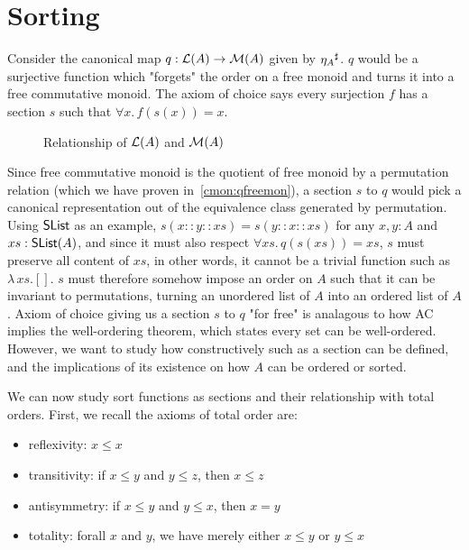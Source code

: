 \section{Sorting}
\label{sec:sorting}

Consider the canonical map $q : \mathcal{L}(A) \to \mathcal{M}(A)$ given by ${\eta_A}^{\sharp}$. $q$ would be a surjective
function which "forgets" the order on a free monoid and turns it into a free commutative monoid.
The axiom of choice says every surjection $f$ has a section $s$ such that $\forall x.\, f(s(x)) = x$.

\begin{figure}[H]
    \centering
    \caption{Relationship of $\mathcal{L}(A)$ and $\mathcal{M}(A)$}
    \label{fig:enter-label}
\end{figure}

Since free commutative monoid is the quotient of free monoid by a permutation relation
(which we have proven in~\ref{cmon:qfreemon}), a section $s$ to $q$ would pick a canonical representation
out of the equivalence class generated by permutation.
Using $\operatorname{\mathsf{SList}}$ as an example, $s(x :: y :: xs) = s(y :: x :: xs)$ for any $x, y : A$ and $xs : \operatorname{\mathsf{SList}}(A)$,
and since it must also respect $\forall xs.\,q(s(xs)) = xs$, $s$ must preserve all content of $xs$,
in other words, it cannot be a trivial function such as $\lambda\,xs. []$.
$s$ must therefore
somehow impose an order on $A$ such that it can be invariant to permutations, turning an unordered list of $A$
into an ordered list of $A$. Axiom of choice giving us a section $s$ to $q$ "for free" is analagous to how
AC implies the well-ordering theorem, which states every set can be well-ordered. However, we want to study
how constructively such as a section can be defined, and the implications of its existence on how $A$
can be ordered or sorted.

We can now study sort functions as sections and their relationship with total orders.
First, we recall the axioms of total order are:
\begin{itemize}
    \item reflexivity: $x \leq x$
    \item transitivity: if $x \leq y$ and $y \leq z$, then $x \leq z$
    \item antisymmetry: if $x \leq y$ and $y \leq x$, then $x = y$
    \item totality: forall $x$ and $y$, we have merely either $x \leq y$ or $y \leq x$ 
\end{itemize}

